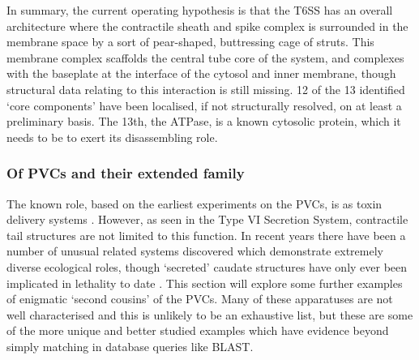 In summary, the current operating hypothesis is that the T6SS has an overall architecture where the contractile sheath and spike complex is surrounded in the membrane space by a sort of pear-shaped, buttressing cage of struts. This membrane complex scaffolds the central tube core of the system, and complexes with the baseplate at the interface of the cytosol and inner membrane, though structural data relating to this interaction is still missing. 12 of the 13 identified `core components' have been localised, if not structurally resolved, on at least a preliminary basis. The 13th, the ATPase, is a known cytosolic protein, which it needs to be to exert its disassembling role.


\subsubsection{Of PVCs and their extended family}
The known role, based on the earliest experiments on the PVCs, is as toxin delivery systems \citep{Yang2006}. However, as seen in the Type VI Secretion System, contractile tail structures are not limited to this function. In recent years there have been a number of unusual related systems discovered which demonstrate extremely diverse ecological roles, though `secreted' caudate structures have only ever been implicated in lethality to date \citep{Shikuma2014}. This section will explore some further examples of enigmatic `second cousins' of the PVCs. Many of these apparatuses are not well characterised and this is unlikely to be an exhaustive list, but these are some of the more unique and better studied examples which have evidence beyond simply matching in database queries like BLAST.

